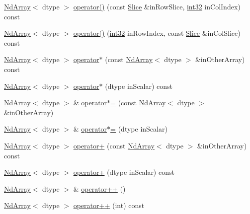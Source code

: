 \begin{DoxyCompactItemize}
\mbox{\hyperlink{class_num_c_1_1_nd_array}{Nd\+Array}}$<$ dtype $>$ \mbox{\hyperlink{class_num_c_1_1_nd_array_abc89e90ee2777842c911f640c8d86228}{operator()}} (const \mbox{\hyperlink{class_num_c_1_1_slice}{Slice}} \&in\+Row\+Slice, \mbox{\hyperlink{namespace_num_c_aa5a7e69266097d55816d4cdb19542b53}{int32}} in\+Col\+Index) const
\item 
\mbox{\hyperlink{class_num_c_1_1_nd_array}{Nd\+Array}}$<$ dtype $>$ \mbox{\hyperlink{class_num_c_1_1_nd_array_a6f395ba86e934cc3291c6dbb1f89c13e}{operator()}} (\mbox{\hyperlink{namespace_num_c_aa5a7e69266097d55816d4cdb19542b53}{int32}} in\+Row\+Index, const \mbox{\hyperlink{class_num_c_1_1_slice}{Slice}} \&in\+Col\+Slice) const
\item 
\mbox{\hyperlink{class_num_c_1_1_nd_array}{Nd\+Array}}$<$ dtype $>$ \mbox{\hyperlink{class_num_c_1_1_nd_array_a7c3d42b830320dfd322e71757cb7e001}{operator$\ast$}} (const \mbox{\hyperlink{class_num_c_1_1_nd_array}{Nd\+Array}}$<$ dtype $>$ \&in\+Other\+Array) const
\item 
\mbox{\hyperlink{class_num_c_1_1_nd_array}{Nd\+Array}}$<$ dtype $>$ \mbox{\hyperlink{class_num_c_1_1_nd_array_acc8e2a1e0ed7f63df71b4e1137bd0edd}{operator$\ast$}} (dtype in\+Scalar) const
\item 
\mbox{\hyperlink{class_num_c_1_1_nd_array}{Nd\+Array}}$<$ dtype $>$ \& \mbox{\hyperlink{class_num_c_1_1_nd_array_ad3aafa9b18db12bf67f9f1e1795a6043}{operator$\ast$=}} (const \mbox{\hyperlink{class_num_c_1_1_nd_array}{Nd\+Array}}$<$ dtype $>$ \&in\+Other\+Array)
\item 
\mbox{\hyperlink{class_num_c_1_1_nd_array}{Nd\+Array}}$<$ dtype $>$ \& \mbox{\hyperlink{class_num_c_1_1_nd_array_ac6da3d583de0971629230e8d612dacb5}{operator$\ast$=}} (dtype in\+Scalar)
\item 
\mbox{\hyperlink{class_num_c_1_1_nd_array}{Nd\+Array}}$<$ dtype $>$ \mbox{\hyperlink{class_num_c_1_1_nd_array_a910f4bbf7dc623d98a633c9490eb83c1}{operator+}} (const \mbox{\hyperlink{class_num_c_1_1_nd_array}{Nd\+Array}}$<$ dtype $>$ \&in\+Other\+Array) const
\item 
\mbox{\hyperlink{class_num_c_1_1_nd_array}{Nd\+Array}}$<$ dtype $>$ \mbox{\hyperlink{class_num_c_1_1_nd_array_afebba69128d3f3b5f72de7e4c952f4d5}{operator+}} (dtype in\+Scalar) const
\item 
\mbox{\hyperlink{class_num_c_1_1_nd_array}{Nd\+Array}}$<$ dtype $>$ \& \mbox{\hyperlink{class_num_c_1_1_nd_array_ac3973c61bcd5933d28b186c97a455e8d}{operator++}} ()
\item 
\mbox{\hyperlink{class_num_c_1_1_nd_array}{Nd\+Array}}$<$ dtype $>$ \mbox{\hyperlink{class_num_c_1_1_nd_array_a47f9898e6fbe353942d90ed1f37ff79a}{operator++}} (int) const

\end{DoxyCompactItemize}
